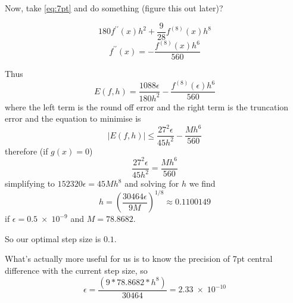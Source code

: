Now, take \cref{eq:7pt} and do something (figure this out later)?

\begin{equation}
180f^{\prime\prime}(x)h^2+\frac{9}{28}f^{(8)}(x)h^8
\end{equation}
\begin{equation}
  f^{\prime\prime}(x)=-\frac{f^{(8)}(x)h^6}{560}
\end{equation}

Thus
\begin{equation}
  E(f,h) = \frac{1088\epsilon}{180h^2}-\frac{f^{(8)}(\epsilon)h^6}{560}
\end{equation}
where the left term is the round off error and the right term is the truncation error and the equation to minimise is
\begin{equation}
  \left|E(f,h)\right| \leq \frac{27^2\epsilon}{45h^2}-\frac{Mh^6}{560}
\end{equation}
therefore (if $g(x) = 0$)
\begin{equation}
  \frac{27^2\epsilon}{45h^2}=\frac{Mh^6}{560}
\end{equation}
simplifying to $152320\epsilon = 45Mh^8$ and solving for $h$ we find
\begin{equation}
  h = \left(\frac{30464\epsilon}{9M}\right)^{1/8} \approx 0.1100149
\end{equation}
if $\epsilon = 0.5\;\times\;10^{-9}$ and $M = 78.8682$.

So our optimal step size is $0.1$.

What's actually more useful for us is to know the precision of 7pt central difference with the current step size, so
\begin{equation}
\epsilon = \frac{\left(9*78.8682*h^8\right)}{30464} = 2.33\;\times\;10^{-10}
\end{equation}